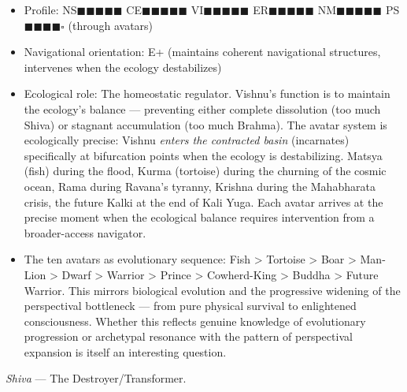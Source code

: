 \begin{itemize}[nosep,leftmargin=*]
  \item Profile: NS$\blacksquare$$\blacksquare$$\blacksquare$$\blacksquare$$\blacksquare$ CE$\blacksquare$$\blacksquare$$\blacksquare$$\blacksquare$$\blacksquare$ VI$\blacksquare$$\blacksquare$$\blacksquare$$\blacksquare$$\blacksquare$ ER$\blacksquare$$\blacksquare$$\blacksquare$$\blacksquare$$\blacksquare$ NM$\blacksquare$$\blacksquare$$\blacksquare$$\blacksquare$$\blacksquare$ PS$\blacksquare$$\blacksquare$$\blacksquare$$\blacksquare$$\square$ (through avatars)
  \item Navigational orientation: E+ (maintains coherent navigational structures, intervenes when the ecology destabilizes)
  \item Ecological role: The homeostatic regulator. Vishnu's function is to maintain the ecology's balance — preventing either complete dissolution (too much Shiva) or stagnant accumulation (too much Brahma). The avatar system is ecologically precise: Vishnu \textit{enters the contracted basin} (incarnates) specifically at bifurcation points when the ecology is destabilizing. Matsya (fish) during the flood, Kurma (tortoise) during the churning of the cosmic ocean, Rama during Ravana's tyranny, Krishna during the Mahabharata crisis, the future Kalki at the end of Kali Yuga. Each avatar arrives at the precise moment when the ecological balance requires intervention from a broader-access navigator.
  \item The ten avatars as evolutionary sequence: Fish > Tortoise > Boar > Man-Lion > Dwarf > Warrior > Prince > Cowherd-King > Buddha > Future Warrior. This mirrors biological evolution and the progressive widening of the perspectival bottleneck — from pure physical survival to enlightened consciousness. Whether this reflects genuine knowledge of evolutionary progression or archetypal resonance with the pattern of perspectival expansion is itself an interesting question.
\end{itemize}


\textit{Shiva} — The Destroyer/\allowbreak Transformer.

